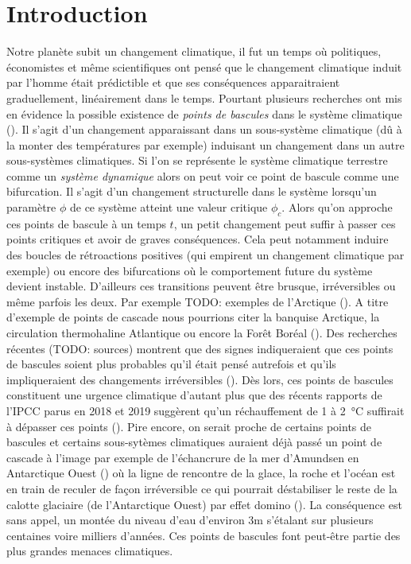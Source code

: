 \section{Introduction}

Notre planète subit un changement climatique, il fut un temps où politiques, économistes et même scientifiques ont pensé que le changement climatique induit par l'homme était prédictible et que ses conséquences apparaitraient graduellement, linéairement dans le temps. Pourtant plusieurs recherches ont mis en évidence la possible existence de \emph{points de bascules} dans le système climatique (\cite{lenton_tipping_2008}). Il s'agit d'un changement apparaissant dans un sous-système climatique (dû à la monter des températures par exemple) induisant un changement dans un autre sous-systèmes climatiques. Si l'on se représente le système climatique terrestre comme un \emph{système dynamique} alors on peut voir ce point de bascule comme une bifurcation. Il s'agit d'un changement structurelle dans le système lorsqu'un paramètre $\phi$ de ce système atteint une valeur critique $\phi_c$. Alors qu'on approche ces points de bascule à un temps $t$, un petit changement peut suffir à passer ces points critiques et avoir de graves conséquences. Cela peut notamment induire des boucles de rétroactions positives (qui empirent un changement climatique par exemple) ou encore des bifurcations où le comportement future du système devient instable. D'ailleurs ces transitions peuvent être brusque, irréversibles ou même parfois les deux. Par exemple TODO: exemples de l'Arctique (\cite{Lenton_2012}). A titre d'exemple de points de cascade nous pourrions citer la banquise Arctique, la circulation thermohaline Atlantique ou encore la Forêt Boréal (\cite{lenton_tipping_2008}). Des recherches récentes (TODO: sources) montrent que des signes indiqueraient que ces points de bascules soient plus probables qu'il était pensé autrefois et qu'ils impliqueraient des changements irréversibles (\cite{lenton_climate_2019_too_risky}). Dès lors, ces points de bascules constituent une urgence climatique d'autant plus que des récents rapports de l'IPCC parus en 2018 et 2019 suggèrent qu'un réchauffement de 1 à \SI{2}{\celsius} suffirait à dépasser ces points (\cite{ipcc_global_2018,portner_ipcc_2019}). Pire encore, on serait proche de certains points de bascules et certains sous-sytèmes climatiques auraient déjà passé un point de cascade à l'image par exemple de l'échancrure de la mer d'Amundsen en Antarctique Ouest (\cite{portner_ipcc_2019}) où la ligne de rencontre de la glace, la roche et l'océan est en train de reculer de façon irréversible ce qui pourrait déstabiliser le reste de la calotte glaciaire (de l'Antarctique Ouest) par effet domino (\cite{feldmann_collapse_2015_amundsen}). La conséquence est sans appel, un montée du niveau d'eau d'environ 3m s'étalant sur plusieurs centaines voire milliers d'années. Ces points de bascules font peut-être partie des plus grandes menaces climatiques.

